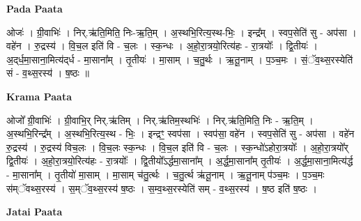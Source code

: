 \documentclass[17pt]{extarticle}
\begin{document}
\textbf{Pada Paata} \newline

ओजः॑ । ग्री॒वाभिः॑ । निर्.ऋ॑ति॒मिति॒ निः-ऋ॒ति॒म् । अ॒स्थभि॒रित्य॒स्थ-भिः॒ । इन्द्र᳚म् । स्वप॒सेति॑ सु - अप॑सा । वहे॑न । रु॒द्रस्य॑ । वि॒च॒ल इति॑ वि - च॒लः । स्क॒न्धः । अ॒हो॒रा॒त्रयो॒रित्य॑हः - रा॒त्रयोः᳚ । द्वि॒तीयः॑ । अ॒द्‌र्ध॒मा॒साना॒मित्य॑द्‌र्ध - मा॒साना᳚म् । तृ॒तीयः॑ । मा॒साम् । च॒तु॒र्थः । ऋ॒तू॒नाम् । प॒ञ्च॒मः । सं॒ॅव॒थ्स॒रस्येति॑ सं - व॒थ्स॒रस्य॑ । ष॒ष्ठः ॥  \newline


\textbf{Krama Paata} \newline

ओजो᳚ ग्री॒वाभिः॑ । ग्री॒वाभि॒र् निर्.ऋ॑तिम् । निर्.ऋ॑तिम॒स्थभिः॑ । निर्.ऋ॑ति॒मिति॒ निः - ऋ॒ति॒म् । अ॒स्थभि॒रिन्द्र᳚म् । अ॒स्थभि॒रित्य॒स्थ - भिः॒ । इन्द्रꣳ॒॒ स्वप॑सा । स्वप॑सा॒ वहे॑न । स्वप॒सेति॑ सु - अप॑सा । वहे॑न रु॒द्रस्य॑ । रु॒द्रस्य॑ विच॒लः । वि॒च॒लः स्क॒न्धः । वि॒च॒ल इति॑ वि - च॒लः । स्क॒न्धो॑ऽहोरा॒त्रयोः᳚ । अ॒हो॒रा॒त्रयो᳚र् द्वि॒तीयः॑ । अ॒हो॒रा॒त्रयो॒रित्य॑हः - रा॒त्रयोः᳚ । द्वि॒तीयो᳚ऽर्द्धमा॒साना᳚म् । अ॒र्द्ध॒मा॒साना᳚म् तृ॒तीयः॑ । अ॒र्द्ध॒मा॒साना॒मित्य॑र्द्ध - मा॒साना᳚म् । तृ॒तीयो॑ मा॒साम् । मा॒साम् च॑तु॒र्त्थः । च॒तु॒र्त्थ ऋ॑तू॒नाम् । ऋ॒तू॒नाम् प॑ञ्च॒मः । प॒ञ्च॒मः स॑म्ॅवथ्स॒रस्य॑ । स॒म्ॅव॒थ्स॒रस्य॑ ष॒ष्ठः । स॒म्व॒थ्स॒रस्येति॑ सम् - व॒थ्स॒रस्य॑ । ष॒ष्ठ इति॑ ष॒ष्ठः । \newline

\textbf{Jatai Paata} \newline
\end{document}
